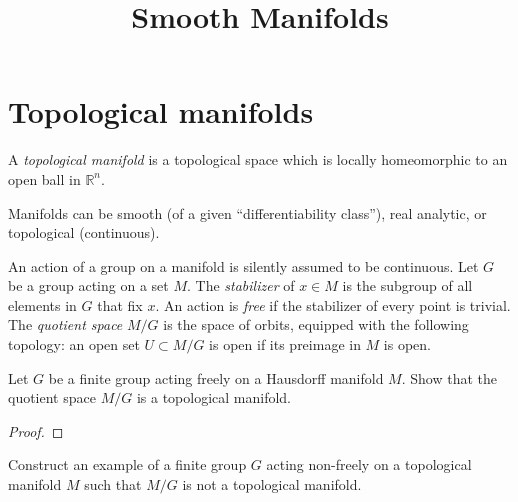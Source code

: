 



\title{Smooth Manifolds}
\maketitle

\label{section-phantom}
\tableofcontents

\section{Topological manifolds}
\label{section-topological-manifolds}

\begin{definition}
\label{definition-topological-manifold}
A {\it topological manifold} is a topological
space which is locally homeomorphic to an
open ball in $\mathbb{R}^n$.
\end{definition}

\medskip\noindent
Manifolds can be smooth (of a given
``differentiability class''),
real analytic, or topological (continuous).

\begin{definition}
\label{definition-group-action-topological-manifold}
An action of a group on a manifold is
silently assumed to be continuous. Let $G$
be a group acting on a set $M$. The
\emph{stabilizer} of $x \in M$ is the
subgroup of all elements in $G$ that fix
$x$. An action is \emph{free} if the
stabilizer of every point is trivial. The
\emph{quotient space} $M/G$ is the space of
orbits, equipped with the following
topology: an open set $U \subset M/G$ is
open if its preimage in $M$ is open.
\end{definition}

\begin{exercise}
\label{exercise-finite-free-quotient-manifold}
Let $G$ be a finite group acting freely on a
Hausdorff manifold $M$. Show that the
quotient space $M/G$ is a topological
manifold.
\end{exercise}

\begin{proof}
%
\end{proof}

\begin{exercise}
\label{exercise-finite-nonfree-quotient-not-manifold}
Construct an example of a finite group $G$
acting non-freely on a topological manifold
$M$ such that $M/G$ is not a topological
manifold.
\end{exercise}

